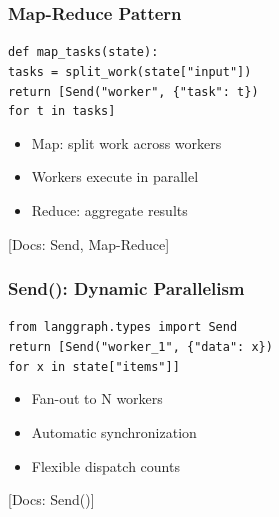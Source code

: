 \documentclass[aspectratio=169,11pt]{beamer}
\newcommand{\docref}[1]{{\scriptsize\color{docgray}[Docs: #1]}}
\begin{document}
\begin{frame}
\frametitle{Map-Reduce Pattern}
\begin{tipbox}
\texttt{def map\_tasks(state):}\\
\texttt{tasks = split\_work(state["input"])}\\
\texttt{return [Send("worker", \{"task": t\})}\\
\texttt{for t in tasks]}
\end{tipbox}
\vspace{0.1cm}
\begin{tipbox}
\setlength{\itemsep}{1pt}
\begin{itemize}
\item Map: split work across workers
\item Workers execute in parallel
\item Reduce: aggregate results
\end{itemize}
\end{tipbox}
\docref{Send, Map-Reduce}
\end{frame}

\begin{frame}
\frametitle{Send(): Dynamic Parallelism}
\begin{tipbox}
\texttt{from langgraph.types import Send}\\
\texttt{return [Send("worker\_1", \{"data": x\})}\\
\texttt{for x in state["items"]]}
\end{tipbox}
\vspace{0.1cm}
\begin{tipbox}[Benefits]
\setlength{\itemsep}{1pt}
\begin{itemize}
\item Fan-out to N workers
\item Automatic synchronization
\item Flexible dispatch counts
\end{itemize}
\end{tipbox}
\docref{Send()}
\end{frame}
\end{document}
